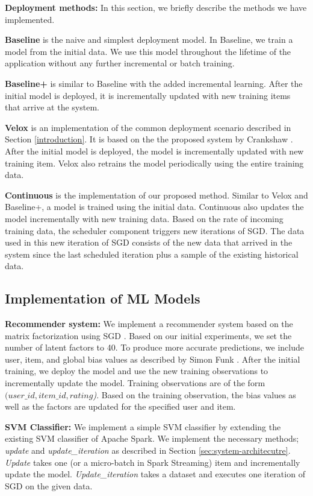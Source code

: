 \documentclass{vldb}
\begin{document}
\textbf{Deployment methods:} In this section, we briefly describe the methods we have implemented.

\textbf{Baseline} is the naive and simplest deployment model. 
In Baseline, we train a model from the initial data.
We use this model throughout the lifetime of the application without any further incremental or batch training.

\textbf{Baseline+} is similar to Baseline with the added incremental learning.
After the initial model is deployed, it is incrementally updated with new training items that arrive at the system.

\textbf{Velox} is an implementation of the common deployment scenario described in Section \ref{introduction}.
It is based on the the proposed system by Crankshaw \cite{crankshaw2014missing}. 
After the initial model is deployed, the model is incrementally updated with new training item.
Velox also retrains the model periodically using the entire training data.


\textbf{Continuous} is the implementation of our proposed method. 
Similar to Velox and Baseline+, a model is trained using the initial data.
Continuous also updates the model incrementally with new training data.
Based on the rate of incoming training data, the scheduler component triggers new iterations of SGD.
The data used in this new iteration of SGD consists of the new data that arrived in the system since the last scheduled iteration plus a sample of the existing historical data.

\subsection{Implementation of ML Models}

\textbf{Recommender system:} We implement a recommender system based on the matrix factorization using SGD \cite{funk2006netflix}.
Based on our initial experiments, we set the number of latent factors to 40.
To produce more accurate predictions, we include user, item, and global bias values as described by Simon Funk \cite{koren2009matrix}.
After the initial training, we deploy the model and use the new training observations to incrementally update the model.
Training observations are of the form \textit{\((user\_id, item\_id, rating\))}.
Based on the training observation, the bias values as well as the factors are updated for the specified user and item.

\textbf{SVM Classifier:} We implement a simple SVM classifier by extending the existing SVM classifier of Apache Spark.
We implement the necessary methods; \textit{update} and \textit{update\_iteration} as described in Section \ref{sec:system-architecutre}.
\textit{Update} takes one (or a micro-batch in Spark Streaming) item and incrementally update the model.
\textit{Update\_iteration} takes a dataset and executes one iteration of SGD on the given data.
\end{document}
